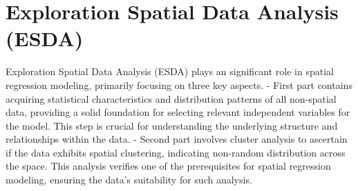 \documentclass[
]{article}
\newenvironment{Shaded}{\begin{snugshade}}{\end{snugshade}}
\newcommand{\AttributeTok}[1]{\textcolor[rgb]{0.13,0.29,0.53}{#1}}
\newcommand{\CommentTok}[1]{\textcolor[rgb]{0.56,0.35,0.01}{\textit{#1}}}
\newcommand{\ConstantTok}[1]{\textcolor[rgb]{0.56,0.35,0.01}{#1}}
\newcommand{\FloatTok}[1]{\textcolor[rgb]{0.00,0.00,0.81}{#1}}
\newcommand{\FunctionTok}[1]{\textcolor[rgb]{0.13,0.29,0.53}{\textbf{#1}}}
\newcommand{\NormalTok}[1]{#1}
\newcommand{\OtherTok}[1]{\textcolor[rgb]{0.56,0.35,0.01}{#1}}
\newcommand{\SpecialCharTok}[1]{\textcolor[rgb]{0.81,0.36,0.00}{\textbf{#1}}}
\newcommand{\StringTok}[1]{\textcolor[rgb]{0.31,0.60,0.02}{#1}}
\begin{document}
\begin{Shaded}
\end{Shaded}

\hypertarget{exploration-spatial-data-analysis-esda}{%
\section{Exploration Spatial Data Analysis
(ESDA)}\label{exploration-spatial-data-analysis-esda}}

Exploration Spatial Data Analysis (ESDA) plays an significant role in
spatial regression modeling, primarily focusing on three key aspects. -
First part contains acquiring statistical characteristics and
distribution patterns of all non-spatial data, providing a solid
foundation for selecting relevant independent variables for the model.
This step is crucial for understanding the underlying structure and
relationships within the data. - Second part involves cluster analysis
to ascertain if the data exhibits spatial clustering, indicating
non-random distribution across the space. This analysis verifies one of
the prerequisites for spatial regression modeling, ensuring the data's
suitability for such analysis.
\end{document}
